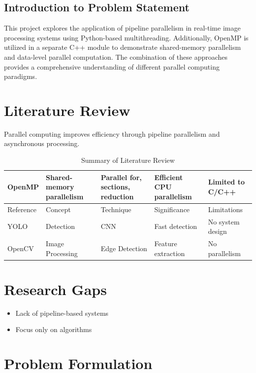 \documentclass[12pt]{report}
\begin{document}
\section{Introduction to Problem Statement}
This project explores the application of pipeline parallelism in real-time image processing systems using Python-based multithreading. Additionally, OpenMP is utilized in a separate C++ module to demonstrate shared-memory parallelism and data-level parallel computation. The combination of these approaches provides a comprehensive understanding of different parallel computing paradigms.

\chapter{Literature Review}

Parallel computing improves efficiency through pipeline parallelism and asynchronous processing.
\renewcommand{\arraystretch}{1.3}
\begin{table}[h]
\centering
\begin{tabular}{|l|l|l|l|l|}
\hline
OpenMP & Shared-memory parallelism & Parallel for, sections, reduction & Efficient CPU parallelism & Limited to C/C++ \\ \hline
Reference & Concept & Technique & Significance & Limitations \\ \hline
YOLO & Detection & CNN & Fast detection & No system design \\ \hline
OpenCV & Image Processing & Edge Detection & Feature extraction & No parallelism \\ \hline
\end{tabular}
\caption{Summary of Literature Review}
\end{table}

\chapter{Research Gaps}
\begin{itemize}
\item Lack of pipeline-based systems
\item Focus only on algorithms
\end{itemize}

\chapter{Problem Formulation}
\end{document}
